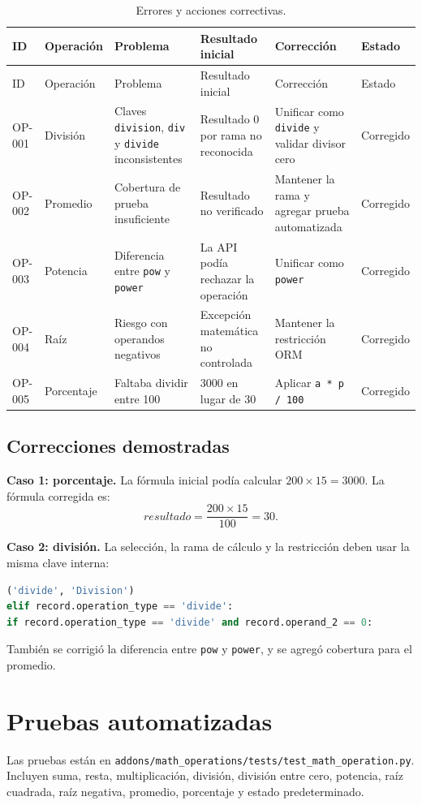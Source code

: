 \documentclass{article}
\begin{document}
\begin{longtable}{p{1.2cm}p{1.5cm}p{3.2cm}p{2.4cm}p{2.4cm}p{1.5cm}}
\caption{Errores y acciones correctivas.}\\
\toprule
ID & Operación & Problema & Resultado inicial & Corrección & Estado \\
\midrule
\endfirsthead
\toprule
ID & Operación & Problema & Resultado inicial & Corrección & Estado \\
\midrule
\endhead
OP-001 & División & Claves \texttt{division}, \texttt{div} y \texttt{divide} inconsistentes & Resultado 0 por rama no reconocida & Unificar como \texttt{divide} y validar divisor cero & Corregido \\
OP-002 & Promedio & Cobertura de prueba insuficiente & Resultado no verificado & Mantener la rama y agregar prueba automatizada & Corregido \\
OP-003 & Potencia & Diferencia entre \texttt{pow} y \texttt{power} & La API podía rechazar la operación & Unificar como \texttt{power} & Corregido \\
OP-004 & Raíz & Riesgo con operandos negativos & Excepción matemática no controlada & Mantener la restricción ORM & Corregido \\
OP-005 & Porcentaje & Faltaba dividir entre 100 & 3000 en lugar de 30 & Aplicar \texttt{a * p / 100} & Corregido \\
\bottomrule
\end{longtable}

\subsection{Correcciones demostradas}
\textbf{Caso 1: porcentaje.} La fórmula inicial podía calcular \(200\times15=3000\). La fórmula corregida es:
\[
resultado = \frac{200\times15}{100}=30.
\]

\textbf{Caso 2: división.} La selección, la rama de cálculo y la restricción deben usar la misma clave interna:
\begin{lstlisting}[language=Python]
('divide', 'Division')
elif record.operation_type == 'divide':
if record.operation_type == 'divide' and record.operand_2 == 0:
\end{lstlisting}

También se corrigió la diferencia entre \texttt{pow} y \texttt{power}, y se agregó cobertura para el promedio.

\section{Pruebas automatizadas}
Las pruebas están en \texttt{addons/math\_operations/tests/test\_math\_operation.py}. Incluyen suma, resta, multiplicación, división, división entre cero, potencia, raíz cuadrada, raíz negativa, promedio, porcentaje y estado predeterminado.
\end{document}

